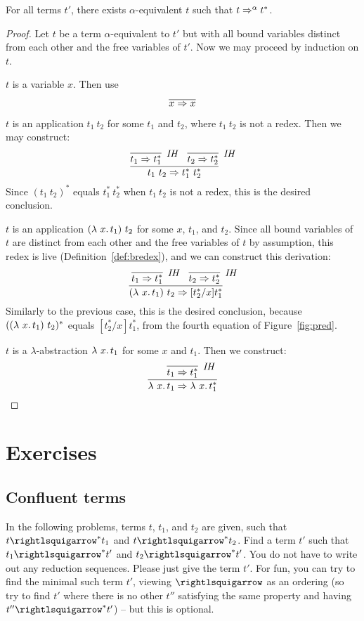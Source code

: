 \begin{lemma}
  For all terms $t'$, there exists $\alpha$-equivalent $t$ such that $t \Rightarrow^\alpha t^*$.
\end{lemma}
\begin{proof}
  Let $t$ be a term $\alpha$-equivalent to $t'$ but with all bound variables distinct from each
  other and the free variables of $t'$.  Now we may proceed by induction on $t$.

  \case{ } $t$ is a variable $x$.  Then use
  \[
  \infer{x \Pred x}{\ }
  \]

  
\case{ } $t$ is an application $t_1\ t_2$ for some $t_1$ and $t_2$, where $t_1\ t_2$ is not a redex. Then we may construct:
\[
\infer{t_1\ t_2 \Pred t_1^*\ t_2^*}{\infer[\textit{IH}]{t_1 \Pred t_1^*}{\ } & \infer[\textit{IH}]{t_2 \Pred t_2^*}{\ }}
\]
\noindent Since $(t_1\ t_2)^*$ equals $t_1^*\ t_2^*$ when $t_1\ t_2$ is not a redex, this is the desired conclusion.

\case{ } $t$ is an application $(\lambda\ x.\, t_1)\ t_2$ for some $x$, $t_1$, and $t_2$. Since all bound variables of $t$
are distinct from each other and the free variables of $t$ by assumption, this redex is live
(Definition~\ref{def:bredex}), and we can construct this derivation:
\[
\infer{(\lam{x}{t_1})\ t_2 \Pred [t_2^*/x]t_1^*}{\infer[\textit{IH}]{t_1 \Pred t_1^*}{\ } & \infer[\textit{IH}]{t_2 \Pred t_2^*}{\ }}
\]
\noindent Similarly to the previous case, this is the desired conclusion, because $((\lambda\ x.\, t_1)\ t_2)^*$ equals
$[t_2^*/x]t_1^*$, from the fourth equation of Figure~\ref{fig:pred}.

\case{ } $t$ is a $\lambda$-abstraction $\lambda\ x.\, t_1$ for some $x$ and $t_1$. Then we construct:
\[
\infer{\lam{x}{t_1} \Pred \lam{x}{t_1^*}}{\infer[\textit{IH}]{t_1 \Pred t_1^*}{\ }}
\]
\end{proof}

\section{Exercises}

\subsection{Confluent terms}

In the following problems, terms $t$, $t_1$, and $t_2$ are given, such
that $t\betaa^* t_1$ and $t\betaa^* t_2$.  Find a term $t'$ such
that $t_1\betaa^* t'$ and $t_2\betaa^* t'$.  You do not have to
write out any reduction sequences.  Please just give the term $t'$.
For fun, you can try to find the minimal such term $t'$, viewing $\betaa$
as an ordering (so try to find $t'$ where there is no other $t''$
satisfying the same property and having $t''\betaa^* t'$) -- but
this is optional.


